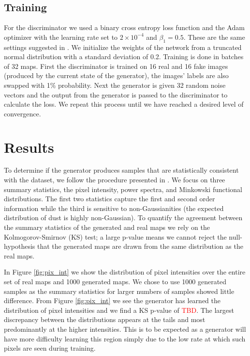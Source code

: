 \documentclass[twocolumn]{aastex62}
\def\tbd{\textcolor{red}{TBD}}
\begin{document}
\subsection{Training}
For the discriminator we used a binary cross entropy loss function and the Adam optimizer with the learning rate set to $2\times10^{-4}$ and $\beta_1=0.5$. These are the same settings suggested in \cite{radford15}. We initialize the weights of the network from a truncated normal distribution with a standard deviation of 0.2. Training is done in batches of 32 maps. First the discriminator is trained on 16 real and 16 fake images (produced by the current state of the generator), the images' labels are also swapped with 1\% probability. Next the generator is given 32 random noise vectors and the output from the generator is passed to the discriminator to calculate the loss. We repeat this process until we have reached a desired level of convergence.






\section{Results}

To determine if the generator produces samples that are statistically consistent with the dataset, we follow the procedure presented in \cite{mustafa17}. We focus on three summary statistics, the pixel intensity, power spectra, and Minkowski functional distributions. The first two statistics capture the first and second order information while the third is sensitive to  non-Gaussianities (the expected distribution of dust is highly non-Gaussian). To quantify the agreement between the summary statistics of the generated and real maps we rely on the Kolmogorov-Smirnov (KS) test; a large p-value means we cannot reject the null-hypothesis that the generated maps are drawn from the same distribution as the real maps.

In Figure \ref{fig:pix_int} we show the distribution of pixel intensities over the entire set of real maps and 1000 generated maps. We chose to use 1000 generated samples as the summary statistics for larger numbers of samples showed little difference. From Figure \ref{fig:pix_int} we see the generator has learned the distribution of pixel intensities and we find a KS p-value of \tbd. The largest discrepancy between the distributions appears at the tails and most predominantly at the higher intensities. This is to be expected as a generator will have more difficulty learning this region simply due to the low rate at which such pixels are seen during training. 
\end{document}
